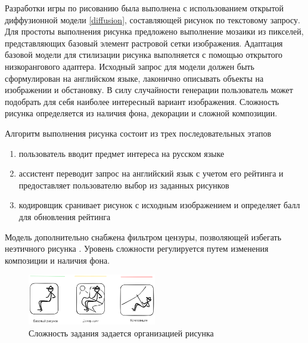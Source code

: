 Разработки игры по рисованию была выполнена с использованием открытой диффузионной модели \ref{diffusion},
составляющей рисунок по текстовому запросу. Для простоты выполнения рисунка предложено выполнение мозаики из
пикселей, представляющих базовый элемент растровой сетки изображения. Адаптация базовой модели для стилизации
рисунка выполняется с помощью открытого низкорангового адаптера. Исходный запрос для модели должен быть 
сформулирован на английском языке, лаконично описывать объекты на изображении и обстановку. 
В силу случайности генерации пользователь может подобрать для себя наиболее интересный вариант изображения.
Сложность рисунка определяется из наличия фона, декорации и сложной композиции. 

Алгоритм выполнения рисунка состоит из трех последовательных этапов \begin{enumerate}
    \item пользователь вводит предмет интереса на русском языке
    \item ассистент переводит запрос на английский язык с учетом его рейтинга и предоставляет пользователю выбор из заданных рисунков
    \item кодировщик сранивает рисунок с исходным изображением и определяет балл для обновления рейтинга
\end{enumerate}

Модель дополнительно снабжена фильтром цензуры, позволяющей избегать неэтичного рисунка \cite{radford2021learning}.
Уровень сложности регулируется путем изменения композиции и наличия фона.
\begin{figure}[h]
    \centering
    \includegraphics[width=0.5\textwidth]{assets/work/games/difficulty.excalidraw.png}
    \caption{Сложность задания задается организацией рисунка}
    \label{draw}
\end{figure}
